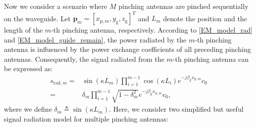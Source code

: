 Now we consider a scenario where $M$ pinching antennas are pinched sequentially on the waveguide. Let $\mathbf{p}_m = [x_{\mathrm{p},m}, y_{\mathrm{g}}, z_{\mathrm{g}}]^T$ and $L_m$ denote the position and the length of the $m$-th pinching antenna, respectively. According to \eqref{EM_model_rad} and \eqref{EM_model_guide_remain}, the power radiated by the $m$-th pinching antenna is influenced by the power exchange coefficients of all preceding pinching antennas. Consequently, the signal radiated from the $m$-th pinching antenna can be expressed as: 
\begin{align}
    s_{\mathrm{rad}, m} =&\sin(\kappa L_m) \prod_{i=1}^{m-1} \cos(\kappa L_i) e^{-j \beta_{\mathrm{g}} x_{\mathrm{p},m}} c_0 \nonumber \\
    = & \delta_m \prod_{i=1}^{m-1} \sqrt{1 - \delta_m^2} e^{-j \beta_{\mathrm{g}} x_{\mathrm{p},m}} c_0,
\end{align} 
where we define $\delta_m \triangleq \sin(\kappa L_m)$. 
Here, we consider two simplified but useful signal radiation model for multiple pinching antennas:
